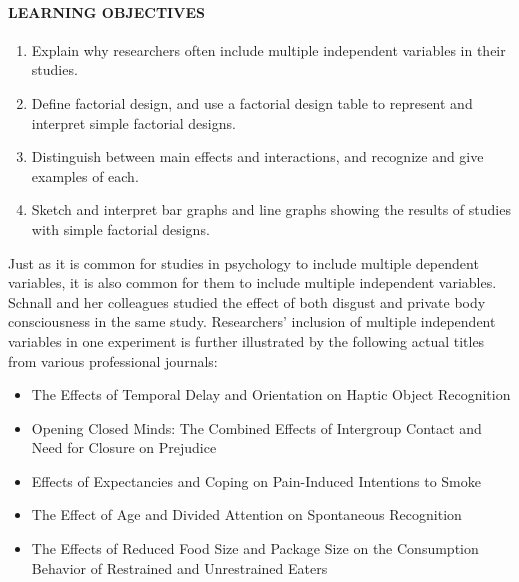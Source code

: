 \documentclass[
]{krantz}
\providecommand{\tightlist}{%
  \setlength{\itemsep}{0pt}\setlength{\parskip}{0pt}}
\begin{document}
\hypertarget{learning-objectives-21}{%
\paragraph*{LEARNING OBJECTIVES}\label{learning-objectives-21}}

\begin{enumerate}
\def\labelenumi{\arabic{enumi}.}
\tightlist
\item
  Explain why researchers often include multiple independent variables in their studies.
\item
  Define factorial design, and use a factorial design table to represent and interpret simple factorial designs.
\item
  Distinguish between main effects and interactions, and recognize and give examples of each.
\item
  Sketch and interpret bar graphs and line graphs showing the results of studies with simple factorial designs.
\end{enumerate}

Just as it is common for studies in psychology to include multiple dependent variables, it is also common for them to include multiple independent variables. Schnall and her colleagues studied the effect of both disgust and private body consciousness in the same study. Researchers' inclusion of multiple independent variables in one experiment is further illustrated by the following actual titles from various professional journals:

\begin{itemize}
\tightlist
\item
  The Effects of Temporal Delay and Orientation on Haptic Object Recognition
\item
  Opening Closed Minds: The Combined Effects of Intergroup Contact and Need for Closure on Prejudice
\item
  Effects of Expectancies and Coping on Pain-Induced Intentions to Smoke
\item
  The Effect of Age and Divided Attention on Spontaneous Recognition
\item
  The Effects of Reduced Food Size and Package Size on the Consumption Behavior of Restrained and Unrestrained Eaters
\end{itemize}
\end{document}

